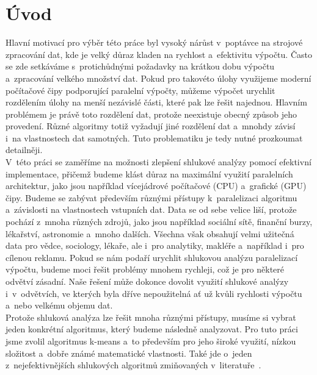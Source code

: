 \pagestyle{plain}
\setcounter{page}{1}

\chapter{Úvod}
Hlavní motivací pro výběr této práce byl vysoký nárůst v~poptávce na strojové zpracování dat, kde je velký důraz kladen na rychlost a~efektivitu výpočtu. Často se zde setkáváme s~protichůdnými požadavky na krátkou dobu výpočtu a~zpracování velkého množství dat.
Pokud pro takovéto úlohy využijeme moderní počítačové čipy podporující paralelní výpočty, můžeme výpočet urychlit rozdělením úlohy na menší nezávislé části, které pak lze řešit najednou. Hlavním problémem je právě toto rozdělení dat, protože neexistuje obecný způsob jeho provedení. Různé algoritmy totiž vyžadují jiné rozdělení dat a~mnohdy závisí i~na vlastnostech dat samotných. Tuto problematiku je tedy nutné prozkoumat detailněji.\\

V~této práci se zaměříme na možnosti zlepšení shlukové analýzy pomocí efektivní implementace, přičemž budeme klást důraz na maximální využití paralelních architektur, jako jsou například vícejádrové počítačové (CPU) a~grafické (GPU) čipy. Budeme se zabývat především různými přístupy k~paralelizaci algoritmu a~závislosti na vlastnostech vstupních dat.
Data se od sebe velice liší, protože pochází z~mnoha různých zdrojů, jako jsou například sociální sítě, finanční burzy, lékařství, astronomie a~mnoho dalších. Všechna však obsahují velmi užitečná data pro vědce, sociology, lékaře, ale i~pro analytiky, makléře a~například i~pro cílenou reklamu.
Pokud se nám podaří urychlit shlukovou analýzu paralelizací výpočtu, budeme moci řešit problémy mnohem rychleji, což je pro některé odvětví zásadní. Naše řešení může dokonce dovolit využití shlukové analýzy i~v~odvětvích, ve kterých byla dříve nepoužitelná ať už kvůli rychlosti výpočtu a~nebo velkému objemu dat.\\

Protože shluková analýza lze řešit mnoha různými přístupy, musíme si vybrat jeden konkrétní algoritmus, který budeme následně analyzovat. Pro tuto práci jsme zvolil algoritmus k-means a~to především pro jeho široké využití, nízkou složitost a~dobře známé matematické vlastnosti. Také jde o~jeden z~nejefektivnějších shlukových algoritmů zmiňovaných v~literatuře~\cite{Aggarwal13}.\\

